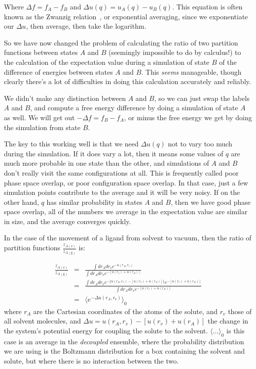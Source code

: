 \documentclass[9pt,bestpractices]{livecoms}
\begin{document}
Where $\Delta f = f_A - f_B$ and $\Delta u(q) =
u_A(q)-u_B(q)$.  This equation is often known as the
Zwanzig relation~\cite{zwanzig1954hightemperature}, or exponential
averaging, since we exponentiate our $\Delta u$, then average, then
take the logarithm.

So we have now changed the problem of calculating the ratio of two
partition functions between states $A$ and $B$ (seemingly impossible
to do by calculus!) to the calculation of the expectation value during
a simulation of state $B$ of the difference of energies between states
$A$ and $B$.  This \textit{seems} manageable, though clearly there's a
lot of difficulties in doing this calculation accurately and reliably.

We didn't make any distinction between $A$ and $B$, so we can just
swap the labels $A$ and $B$, and compute a free energy difference by
doing a simulation of state $A$ as well.  We will get out $-\Delta f =
f_B - f_A$, or minus the free energy we get by doing the simulation
from state $B$.

The key to this working well is that we need $\Delta u(q)$ not
to vary too much during the simulation.  If it does vary a lot, then
it means some values of $q$ are much more probable in one state
than the other, and simulations of $A$ and $B$ don't really visit the
same configurations at all.  This is frequently called poor phase
space overlap, or poor configuration space overlap.  In that case,
just a few simulation points contribute to the average and it will be
very noisy. If on the other hand, $q$ has similar probability in
states $A$ and $B$, then we have good phase space overlap, all of the
numbers we average in the expectation value are similar in size, and
the average converges quickly.

In the case of the movement of a ligand from solvent to vacuum, then
the ratio of partition functions $\frac{z_{A(v)}}{z_{A(\mathrm{g})}}$
  is:

\begin{eqnarray}
  \frac{z_{A(v)}}{z_{A(\mathrm{g})}} &=&
  \frac{
    \int dr_A  dr_v  e^{-u(r_A, r_v) } 
  }{
    \int dr_A dr_v e^{-[u(r_v) + u( r_A  )] } 
  } \\
&=&  \frac{
    \int dr_A  dr_v  e^{-\{ u(r_A, r_v) -  [ u(r_v) + u(r_A) ] \}} e^{-[u(r_v) + u(  r_A  )] } 
  }{
    \int dr_A dr_v e^{-[u(r_v) + u( r_A  )] } 
  } \\
  &=& \langle e^{-\Delta u(r_A, r_v)} \rangle_0
  \label{eq:zratio-solv-average}
\end{eqnarray}
where $r_A$ are the Cartesian coordinates of the atoms of the solute, and $r_v$ those of all solvent molecules, and $\Delta u =  u(r_A , r_v) -  [ u(r_v) + u(r_A ) ]$ the change in the system's potential energy for coupling the solute to the solvent. $\langle \ldots \rangle_0$ is this case is an average in the \textit{decoupled} ensemble, where the probability distribution we are using is the Boltzmann distribution for a box containing the solvent and solute, but where there is no interaction between the two. 
\end{document}
